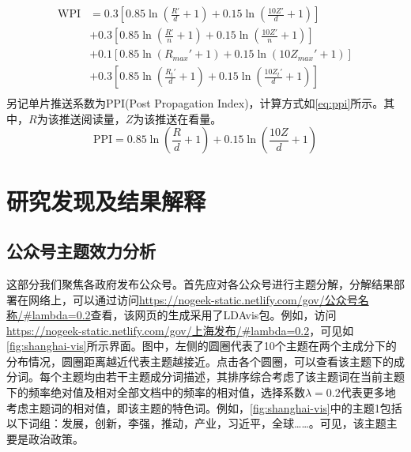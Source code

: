 \documentclass[a4paper,12pt,UTF8]{article}
\begin{document}
    \begin{equation}
      \label{eq:wpi}
      \begin{aligned}
        \text{WPI} &= 0.3\left[0.85 \ln (\frac{R'}{d} + 1)+ 0.15 \ln (\frac{10Z'}{d} + 1)\right] \\
                   &+ 0.3\left[0.85 \ln (\frac{R'}{n} + 1)+ 0.15 \ln (\frac{10Z'}{n} + 1)\right] \\
                   &+ 0.1\left[0.85 \ln (R_{max}' + 1)+ 0.15 \ln (10Z_{max}' + 1)\right] \\
                   &+ 0.3\left[0.85 \ln (\frac{R_t'}{d} + 1)+ 0.15 \ln (\frac{10Z_t'}{d} + 1)\right] \\
      \end{aligned}
    \end{equation}
    另记单片推送系数为PPI(Post Propagation Index)，计算方式如\cref{eq:ppi}所示。其中，$R$为该推送阅读量，$Z$为该推送在看量。
    \begin{equation}
      \label{eq:ppi}
      \text{PPI} = 0.85 \ln (\frac{R}{d} + 1)+ 0.15 \ln (\frac{10Z}{d} + 1)
    \end{equation}
    \section{研究发现及结果解释}
    \subsection{公众号主题效力分析}
    这部分我们聚焦各政府发布公众号。首先应对各公众号进行主题分解\cite{text2vec}，分解结果部署在网络上，可以通过访问\url{https://nogeek-static.netlify.com/gov/公众号名称/#lambda=0.2}查看，该网页的生成采用了LDAvis包\cite{sievert2014ldavis}。例如，访问\url{https://nogeek-static.netlify.com/gov/上海发布/#lambda=0.2}，可见如\cref{fig:shanghai-vis}所示界面。图中，左侧的圆圈代表了10个主题在两个主成分下的分布情况，圆圈距离越近代表主题越接近。点击各个圆圈，可以查看该主题下的成分词。每个主题均由若干主题成分词描述，其排序综合考虑了该主题词在当前主题下的频率绝对值及相对全部文档中的频率的相对值，选择系数$\lambda=0.2$代表更多地考虑主题词的相对值，即该主题的特色词。例如，\cref{fig:shanghai-vis}中的主题1包括以下词组：发展，创新，李强，推动，产业，习近平，全球……。可见，该主题主要是政治政策。
  
\end{document}
